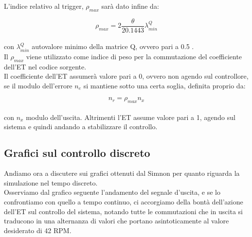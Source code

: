 \documentclass[a4paper,13pt]{article}
\begin{document}
	L'indice relativo al trigger, $\rho_{max}$ sarà dato infine da:
	
\begin{equation*}
	\rho_{max}=2\frac{\theta}{20.1443} \lambda_{min}^{Q}
\end{equation*}\\

	con $\lambda_{min}^{Q}$ autovalore minimo della matrice Q, ovvero pari a 0.5 .\\
	
	Il $\rho_{max}$ viene utilizzato come indice di peso per la commutazione del coefficiente dell'ET nel codice sorgente.
	\\ Il coefficiente dell'ET assumerà valore pari a 0, ovvero non agendo sul controllore, se il modulo dell'errore        	$n_{e}$ si mantiene sotto una certa soglia, definita proprio da:
	
\begin{equation*}
	n_{r}=\rho_{max}n_{x}
\end{equation*} \\

	con $n_{x}$ modulo dell'uscita.
	Altrimenti l'ET assume valore pari a 1, agendo sul sistema e quindi andando a stabilizzare il controllo.
	
\subsection{Grafici sul controllo discreto}
	
	Andiamo ora a discutere sui grafici ottenuti dal Simnon per quanto riguarda la simulazione nel tempo discreto.\\
	Osserviamo dal grafico seguente l'andamento del segnale d'uscita, e se lo confrontiamo con quello a tempo continuo, ci 	accorgiamo della bontà dell'azione dell'ET sul controllo del sistema, notando tutte le commutazioni che in uscita si 		traducono in una alternanza di valori che portano asintoticamente al valore desiderato di 42 RPM.
	
\end{document}
